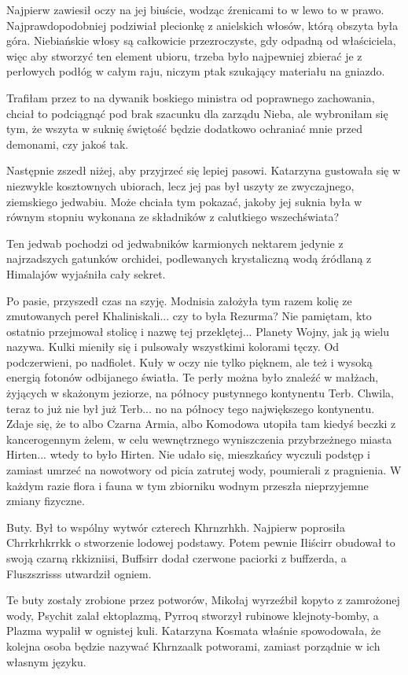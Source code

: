 Najpierw zawiesił oczy na jej biuście, wodząc źrenicami to w lewo to w prawo.
Najprawdopodobniej podziwiał plecionkę z anielskich włosów, którą obszyta była góra.
Niebiańskie włosy są całkowicie przezroczyste, gdy odpadną od właściciela, więc
aby stworzyć ten element ubioru, trzeba było najpewniej zbierać je z perłowych podłóg w całym raju, niczym ptak szukający materiału na gniazdo.
\begin{dialogue}
\ds{} Trafiłam przez to na dywanik boskiego ministra od poprawnego zachowania, chciał to podciągnąć pod brak szacunku dla zarządu Nieba, ale wybroniłam się tym, że wszyta w suknię świętość
będzie dodatkowo ochraniać mnie przed demonami, czy jakoś tak.
\end{dialogue}

Następnie zszedł niżej, aby przyjrzeć się lepiej pasowi.
Katarzyna gustowała się w niezwykle kosztownych ubiorach, lecz jej pas był uszyty ze zwyczajnego, ziemskiego jedwabiu.
Może chciała tym pokazać, jakoby jej suknia była w równym stopniu wykonana ze składników z calutkiego wszechświata?
\begin{dialogue}
\ds{} Ten jedwab pochodzi od jedwabników karmionych nektarem jedynie z najrzadszych gatunków orchidei, podlewanych krystaliczną wodą źródlaną z Himalajów
\dm{} wyjaśniła cały sekret.
\end{dialogue}

Po pasie, przyszedł czas na szyję. Modnisia założyła tym razem kolię ze zmutowanych pereł Khaliniskali...
czy to była Rezurma? Nie pamiętam, kto ostatnio przejmował stolicę i nazwę tej przeklętej... Planety Wojny, jak ją wielu nazywa.
Kulki mieniły się i pulsowały wszystkimi kolorami tęczy. Od podczerwieni, po nadfiolet. Kuły w oczy nie tylko pięknem, ale też i wysoką energią fotonów odbijanego światła.
Te perły można było znaleźć w małżach, żyjących w skażonym jeziorze, na północy pustynnego kontynentu Terb. Chwila, teraz to już nie był już Terb... no na północy tego największego kontynentu.
Zdaje się, że to albo Czarna Armia, albo Komodowa utopiła tam kiedyś beczki z kancerogennym żelem, w celu wewnętrznego wyniszczenia przybrzeżnego miasta Hirten... wtedy to było Hirten.
Nie udało się, mieszkańcy wyczuli podstęp i zamiast umrzeć na nowotwory od picia zatrutej wody, poumierali z pragnienia.
W każdym razie flora i fauna w tym zbiorniku wodnym przeszła nieprzyjemne zmiany fizyczne.

Buty. Był to wspólny wytwór czterech Khrnzrhkh.
Najpierw poprosiła Chrrkrhkrrkk o stworzenie lodowej podstawy.
Potem pewnie Iłiścirr obudował to swoją czarną rkkizniisi, Buffsirr dodał czerwone paciorki z buffzerda, a Fluszszrisss utwardził ogniem.
\begin{dialogue}
\ds{} Te buty zostały zrobione przez potworów, Mikołaj wyrzeźbił kopyto z zamrożonej wody, 
Psychit zalał ektoplazmą, Pyrroq stworzył rubinowe klejnoty-bomby, a Plazma wypalił w ognistej kuli. \dm{}
Katarzyna Kosmata właśnie spowodowała, że kolejna osoba będzie nazywać Khrnzaalk potworami, zamiast porządnie w ich własnym języku.
\end{dialogue}

